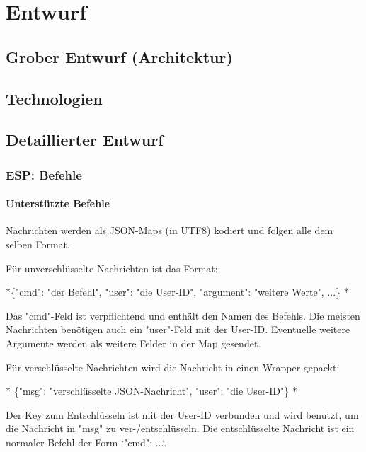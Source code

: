 
\newpage

\chapter{Entwurf} %
\label{cha:entwurf}

\section{Grober Entwurf (Architektur)}
\label{sec:groberentwurf}

\section{Technologien}
\label{sec:technologien}

\section{Detaillierter Entwurf}
\label{sec:detaillierterentwurf}

\subsection{ESP: Befehle}
\subsubsection{ Unterstützte Befehle}

Nachrichten werden als JSON-Maps (in UTF8) kodiert und folgen alle dem selben Format.

Für unverschlüsselte Nachrichten ist das Format:

*\{"cmd": "der Befehl", "user": "die User-ID", "argument": "weitere Werte", ...\}
*

Das "cmd"-Feld ist verpflichtend und enthält den Namen des Befehls. Die meisten Nachrichten benötigen auch ein "user"-Feld mit der User-ID. Eventuelle weitere Argumente werden als weitere Felder in der Map gesendet.

Für verschlüsselte Nachrichten wird die Nachricht in einen Wrapper gepackt:

*
\{"msg": "verschlüsselte JSON-Nachricht", "user": "die User-ID"\}
*

Der Key zum Entschlüsseln ist mit der User-ID verbunden und wird benutzt, um die Nachricht in "msg" zu ver-/entschlüsseln. Die entschlüsselte Nachricht ist ein normaler Befehl der Form `{"cmd": ...}`.

